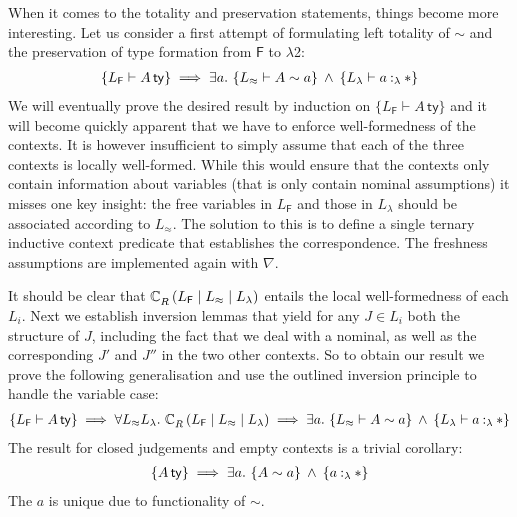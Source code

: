 \documentclass[a4paper,UKenglish]{lipics-v2016}
\newcommand{\ms}{\,}
\newcommand{\mrel}[1]{\mathrel{\ms #1 \ms}}
\newcommand{\mAnd}{\mrel{\wedge}}
\newcommand{\mAll}[1]{\ensuremath{\forall} #1.\ms\ms}
\newcommand{\mEx}[1]{\ensuremath{\exists} #1.\ms\ms}
\newcommand{\SysF}{\ensuremath{\mathsf{F}}\xspace}
\newcommand{\SysL}{$\lambda$2\xspace}
\newcommand{\istyFh}[1]{\ensuremath{#1\ms\mathsf{ty}}}
\newcommand{\typingFh}[2]{\ensuremath{#1 \mathbin{:_{\SysF}} #2}}
\newcommand{\typingLh}[2]{\ensuremath{#1 \mathbin{:_{\lambda}} #2}}
\newcommand{\tyr}{\mathrel{\sim}}
\newcommand{\tmr}{\mathrel{\approx}}
\newcommand{\Prp}{\ensuremath{\textrm{\textasteriskcentered}}}
\newcommand{\emptyctx}{\ensuremath{\bullet}}
\begin{document}
When it comes to the totality and preservation statements, things become more interesting.
Let us consider a first attempt of formulating left totality of $\tyr$ and the preservation of type formation from \SysF to \SysL:
\begin{align*}
  \{L_{\SysF} \vdash \istyFh{A}\} \implies \mEx{a} \{ L_{\tmr} \vdash A \tyr a \} \mAnd \{L_{\lambda} \vdash \typingLh{a}{\Prp}\}
\end{align*}
We will eventually prove the desired result by induction on $\{L_{\SysF} \vdash \istyFh{A}\}$ and it will become quickly apparent that we have to enforce well-formedness of the contexts.
It is however insufficient to simply assume that each of the three contexts is locally well-formed.
While this would ensure that the contexts only contain information about variables (that is only contain nominal assumptions) it misses one key insight: the free variables in $L_{\SysF}$ and those in $L_{\lambda}$ should be associated according to $L_{\tmr}$.
The solution to this is to define a single ternary inductive context predicate that establishes the correspondence.
The freshness assumptions are implemented again with $\nabla$.
\newcommand{\acR}[3]{\ac{R}{~}{#1 \mid #2 \mid #3}}
It should be clear that $\acR{L_{\SysF}}{L_{\tmr}}{L_{\lambda}}$ entails the local well-formedness of each $L_i$.
Next we establish inversion lemmas that yield for any $J \in L_i$ both the structure of $J$, including the fact that we deal with a nominal, as well as the corresponding $J'$ and $J''$ in the two other contexts.
So to obtain our result we prove the following generalisation and use the outlined inversion principle to handle the variable case:
\begin{align*}
  \{L_{\SysF} \vdash \istyFh{A}\} \implies \mAll{L_{\tmr}L_{\lambda}} \acR{L_{\SysF}}{L_{\tmr}}{L_{\lambda}} \implies \mEx{a} \{ L_{\tmr} \vdash A \tyr a \} \mAnd \{L_{\lambda} \vdash \typingLh{a}{\Prp}\}
\end{align*}
The result for closed judgements and empty contexts is a trivial corollary:
\begin{align*}
  \{\istyFh{A}\} \implies \mEx{a} \{ A \tyr a \} \mAnd \{\typingLh{a}{\Prp}\}
\end{align*}
The $a$ is unique due to functionality of $\tyr$.
\end{document}
